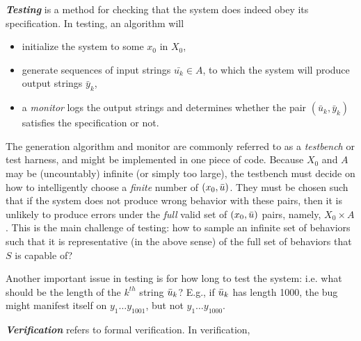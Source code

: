 \emph{\textbf{Testing}} is a method for checking that the system does indeed obey its specification. 
In testing, an algorithm will 
\begin{itemize}
	\item initialize the system to some $x_0$ in $X_0$,
	\item generate sequences of input strings $\bar{u_k} \in A$, to which the system will produce output strings $\bar{y}_k$,
	\item a \emph{monitor} logs the output strings and determines whether the pair $(\bar{u}_k,\bar{y}_k)$ satisfies the specification or not.	
\end{itemize}

The generation algorithm and monitor are commonly referred to as a \emph{testbench} or test harness, and might be implemented in one piece of code. 
Because $X_0$ and $A$ may be (uncountably) infinite (or simply too large), the testbench must decide on how to intelligently choose a \emph{finite} number of $(x_0,\bar{u})$.
They must be chosen such that if the system does not produce wrong behavior with these pairs, then it is unlikely to produce errors under the \emph{full} valid set of $(x_0,\bar{u})$ pairs, namely, $X_0 \times A$.
This is the main challenge of testing: how to sample an infinite set of behaviors such that it is representative (in the above sense) of the full set of behaviors that $S$ is capable of?

Another important issue in testing is for how long to test the system: i.e. what should be the length of the $k^{th}$ string $\bar{u}_k$? 
E.g., if $\bar{u}_k$ has length 1000, the bug might manifest itself on $y_1\ldots y_{1001}$, but not $y_1\ldots y_{1000}$.

\emph{\textbf{Verification}} refers to formal verification.
In verification, 




